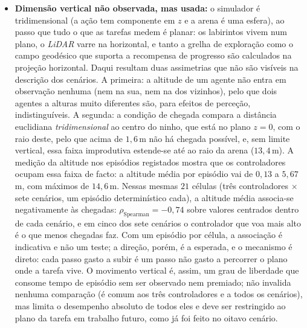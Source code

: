 \documentclass[12pt,reqno, twoside]{amsbook}
\theoremstyle{plain}
\numberwithin{equation}{chapter}
\numberwithin{section}{chapter}
\numberwithin{table}{chapter}
\numberwithin{figure}{chapter}
\begin{document}
\begin{itemize}
    \item \textbf{Dimensão vertical não observada, mas usada:} o simulador é tridimensional (a ação tem componente em $z$ e a arena é uma esfera), ao passo que tudo o que as tarefas medem é planar: os labirintos vivem num plano, o \textit{LiDAR} varre na horizontal, e tanto a grelha de exploração como o campo geodésico que suporta a recompensa de progresso são calculados na projeção horizontal. Daqui resultam duas assimetrias que não são visíveis na descrição dos cenários. A primeira: a altitude de um agente não entra em observação nenhuma (nem na sua, nem na dos vizinhos), pelo que dois agentes a alturas muito diferentes são, para efeitos de perceção, indistinguíveis. A segunda: a condição de chegada compara a distância euclidiana \emph{tridimensional} ao centro do ninho, que está no plano $z = 0$, com o raio deste, pelo que acima de $1{,}6$\,m não há chegada possível, e, sem limite vertical, essa faixa improdutiva estende-se até ao raio da arena ($13{,}4$\,m). A medição da altitude nos episódios registados mostra que os controladores ocupam essa faixa de facto: a altitude média por episódio vai de $0{,}13$ a $5{,}67$\,m, com máximos de $14{,}6$\,m. Nessas mesmas $21$ células (três controladores $\times$ sete cenários, um episódio determinístico cada), a altitude média associa-se negativamente às chegadas: $\rho_{\text{Spearman}} = -0{,}74$ sobre valores centrados dentro de cada cenário, e em cinco dos sete cenários o controlador que voa mais alto é o que menos chegadas faz. Com um episódio por célula, a associação é indicativa e não um teste; a direção, porém, é a esperada, e o mecanismo é direto: cada passo gasto a subir é um passo não gasto a percorrer o plano onde a tarefa vive. O movimento vertical é, assim, um grau de liberdade que consome tempo de episódio sem ser observado nem premiado; não invalida nenhuma comparação (é comum aos três controladores e a todos os cenários), mas limita o desempenho absoluto de todos eles e deve ser restringido ao plano da tarefa em trabalho futuro, como já foi feito no oitavo cenário.

\end{itemize}
\end{document}
